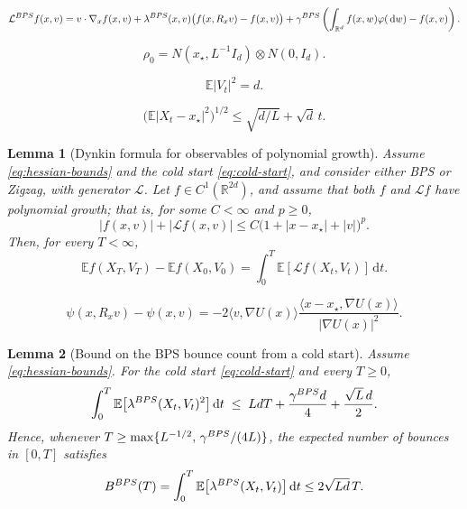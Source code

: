 \documentclass[10pt,a4paper]{amsart}
\newtheorem{lemma}{Lemma}
\newcommand{\E}{\EE}
\newcommand{\EE}{\mathbb{E}}
\newcommand{\R}{\RR}
\newcommand{\RR}{\mathbb{R}}
\newcommand{\abs}[1]{\lvert#1\rvert}
\newcommand{\bps}{{\rm BPS}}
\newcommand{\dd}{\ud}
\newcommand{\ip}[2]{\langle #1,#2\rangle}
\newcommand{\ud}{\,\mathrm{d}}
\begin{document}
\begin{equation}\label{eq:bps-generator}
\mathcal L^{\bps} f(x,v)
=
v\cdot\nabla_x f(x,v)
+
\lambda^{\bps}(x,v)\bigl(f(x,R_x v)-f(x,v)\bigr)
+
\gamma^{\bps}\left(
  \int_{\R^d}f(x,w)\varphi(\dd w)-f(x,v)
\right).
\end{equation}

\begin{equation}\label{eq:cold-start}
        \rho_0= N(x_\star,L^{-1}I_d)\otimes N(0,I_d).
\end{equation}

\begin{equation}\label{eq:velocity-second-moment}
        \E\abs{V_t}^2=d.
\end{equation}

\begin{equation}\label{eq:position-second-moment}
        \bigl(\E\abs{X_t-x_\star}^2\bigr)^{1/2}
        \le\sqrt{d/L}+\sqrt d\,t.
\end{equation}

\begin{lemma}[Dynkin formula for observables of polynomial growth]
\label{lem:dynkin-polynomial}
Assume \eqref{eq:hessian-bounds} and the cold start
\eqref{eq:cold-start}, and consider either BPS or Zigzag, with generator
$\mathcal L$.  Let $f\in C^1(\mathbb R^{2d})$, and assume that both $f$ and $\mathcal Lf$ have polynomial growth; that is, for some $C<\infty$ and $p\ge0$,
\[
        \abs{f(x,v)}+\abs{\mathcal Lf(x,v)}
        \le C\bigl(1+\abs{x-x_\star}+\abs v\bigr)^p.
\]
Then, for every $T<\infty$,
\[
        \E f(X_T,V_T)-\E f(X_0,V_0)
        =\int_0^T\E[\mathcal Lf(X_t,V_t)]\dd t.
\]
\end{lemma}

\begin{equation}\label{eq:bps-motivating-jump}
        \psi(x,R_xv)-\psi(x,v)
        =-2\ip{v}{\nabla U(x)}
          \frac{\ip{x-x_\star}{\nabla U(x)}}
               {\abs{\nabla U(x)}^2}.
\end{equation}

\begin{lemma}[Bound on the BPS bounce count from a cold start]
\label{lem:bps-count}
Assume \eqref{eq:hessian-bounds}.
For the cold start \eqref{eq:cold-start} and every $T\ge0$,
\begin{equation}\label{eq:bps-square-rate-bound}
        \int_0^T\E\bigl[\lambda^{\bps}(X_t,V_t)^2\bigr]\dd t
        \;\le\; LdT+\frac{\gamma^{\bps} d}{4}+\frac{\sqrt L\,d}{2}.
\end{equation}
Hence, whenever $T\ge\max\{L^{-1/2},\,\gamma^{\bps}/(4L)\}$, the expected
number of bounces in $[0,T]$ satisfies
\begin{equation}\label{eq:bps-count-clean}
        B^{\bps}(T)
        =\int_0^T\E\bigl[\lambda^{\bps}(X_t,V_t)\bigr]\dd t
        \le 2\sqrt{Ld}\,T .
\end{equation}
\end{lemma}
\end{document}
